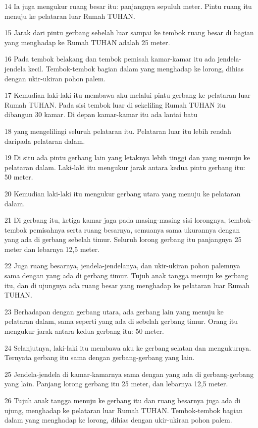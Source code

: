 \par 14 Ia juga mengukur ruang besar itu: panjangnya sepuluh meter. Pintu ruang itu menuju ke pelataran luar Rumah TUHAN.
\par 15 Jarak dari pintu gerbang sebelah luar sampai ke tembok ruang besar di bagian yang menghadap ke Rumah TUHAN adalah 25 meter.
\par 16 Pada tembok belakang dan tembok pemisah kamar-kamar itu ada jendela-jendela kecil. Tembok-tembok bagian dalam yang menghadap ke lorong, dihias dengan ukir-ukiran pohon palem.
\par 17 Kemudian laki-laki itu membawa aku melalui pintu gerbang ke pelataran luar Rumah TUHAN. Pada sisi tembok luar di sekeliling Rumah TUHAN itu dibangun 30 kamar. Di depan kamar-kamar itu ada lantai batu
\par 18 yang mengelilingi seluruh pelataran itu. Pelataran luar itu lebih rendah daripada pelataran dalam.
\par 19 Di situ ada pintu gerbang lain yang letaknya lebih tinggi dan yang menuju ke pelataran dalam. Laki-laki itu mengukur jarak antara kedua pintu gerbang itu: 50 meter.
\par 20 Kemudian laki-laki itu mengukur gerbang utara yang menuju ke pelataran dalam.
\par 21 Di gerbang itu, ketiga kamar jaga pada masing-masing sisi lorongnya, tembok-tembok pemisahnya serta ruang besarnya, semuanya sama ukurannya dengan yang ada di gerbang sebelah timur. Seluruh lorong gerbang itu panjangnya 25 meter dan lebarnya 12,5 meter.
\par 22 Juga ruang besarnya, jendela-jendelanya, dan ukir-ukiran pohon palemnya sama dengan yang ada di gerbang timur. Tujuh anak tangga menuju ke gerbang itu, dan di ujungnya ada ruang besar yang menghadap ke pelataran luar Rumah TUHAN.
\par 23 Berhadapan dengan gerbang utara, ada gerbang lain yang menuju ke pelataran dalam, sama seperti yang ada di sebelah gerbang timur. Orang itu mengukur jarak antara kedua gerbang itu: 50 meter.
\par 24 Selanjutnya, laki-laki itu membawa aku ke gerbang selatan dan mengukurnya. Ternyata gerbang itu sama dengan gerbang-gerbang yang lain.
\par 25 Jendela-jendela di kamar-kamarnya sama dengan yang ada di gerbang-gerbang yang lain. Panjang lorong gerbang itu 25 meter, dan lebarnya 12,5 meter.
\par 26 Tujuh anak tangga menuju ke gerbang itu dan ruang besarnya juga ada di ujung, menghadap ke pelataran luar Rumah TUHAN. Tembok-tembok bagian dalam yang menghadap ke lorong, dihias dengan ukir-ukiran pohon palem.
